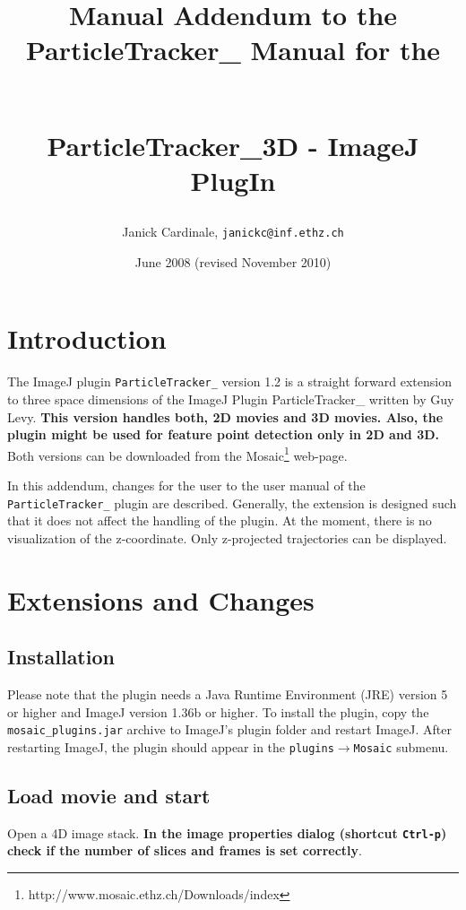 \documentclass{scrartcl}
\title{\begin{normalsize}Manual Addendum to the ParticleTracker\_ Manual for the\end{normalsize} \\ ParticleTracker\_3D - ImageJ PlugIn}
\date{June 2008 (revised November 2010)}
\author{Janick Cardinale, \texttt{janickc@inf.ethz.ch}}
\begin{document}
\maketitle

\section{Introduction}
\label{sec:intro}
The ImageJ plugin \texttt{ParticleTracker\_} version 1.2 is a straight forward extension to three space dimensions of the ImageJ Plugin ParticleTracker\_ written by Guy Levy. \textbf{This version handles both, 2D movies and 3D movies. Also, the plugin might be used for feature point detection only in 2D and 3D.} Both versions can be downloaded from the Mosaic\footnote{http://www.mosaic.ethz.ch/Downloads/index} web-page. 

In this addendum, changes for the user to the user manual of the \texttt{ParticleTracker\_} plugin are described. Generally, the extension is designed such that it does not affect the handling of the plugin. At the moment, there is no visualization of the z-coordinate. Only z-projected trajectories can be displayed.

\section{Extensions and Changes}
\label{sec:pluginstart}
\subsection{Installation}
Please note that the plugin needs a Java Runtime Environment (JRE) version 5 or higher and ImageJ version 1.36b or higher. To install the plugin, copy the \texttt{mosaic\_plugins.jar} archive to ImageJ's plugin folder and restart ImageJ. After restarting ImageJ, the plugin should appear in the \texttt{plugins$\rightarrow$Mosaic} submenu.

\subsection{Load movie and start}
Open a 4D image stack. \textbf{In the image properties dialog (shortcut \texttt{Ctrl-p}) check if the number of slices and frames is set correctly}.

\end{document}

